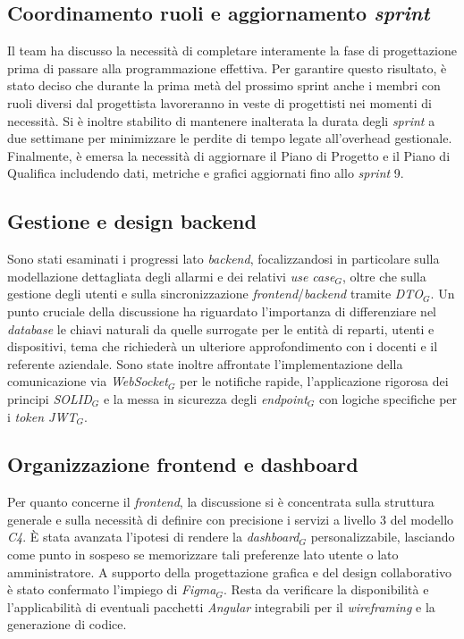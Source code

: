 \documentclass[10pt, letterpaper]{article}
\begin{document}
\subsection*{Coordinamento ruoli e aggiornamento \textit{sprint}}
Il team ha discusso la necessità di completare interamente la fase di progettazione prima di passare alla programmazione effettiva.
Per garantire questo risultato, è stato deciso che durante la prima metà del prossimo sprint anche i membri con ruoli diversi dal progettista lavoreranno in veste di progettisti nei momenti di necessità.
Si è inoltre stabilito di mantenere inalterata la durata degli \textit{sprint} a due settimane per minimizzare le perdite di tempo legate all'overhead gestionale.
Finalmente, è emersa la necessità di aggiornare il Piano di Progetto e il Piano di Qualifica includendo dati, metriche e grafici aggiornati fino allo \textit{sprint} 9.

\subsection*{Gestione e design backend}
Sono stati esaminati i progressi lato \textit{backend}, focalizzandosi in particolare sulla modellazione dettagliata
degli allarmi e dei relativi \textit{use case$_G$}, oltre che sulla gestione degli utenti e sulla sincronizzazione \textit{frontend}/\textit{backend} tramite \textit{DTO$_G$}.
Un punto cruciale della discussione ha riguardato l'importanza di differenziare nel \textit{database} le chiavi naturali da quelle surrogate per le entità di reparti,
utenti e dispositivi, tema che richiederà un ulteriore approfondimento con i docenti e il referente aziendale.
Sono state inoltre affrontate l'implementazione della comunicazione via \textit{WebSocket$_G$} per le notifiche rapide, l'applicazione rigorosa dei principi \textit{SOLID$_G$} e la messa in sicurezza degli \textit{endpoint$_G$} con logiche specifiche per i \textit{token JWT$_G$}.

\subsection*{Organizzazione frontend e dashboard}
Per quanto concerne il \textit{frontend}, la discussione si è concentrata sulla struttura generale e sulla necessità
di definire con precisione i servizi a livello 3 del modello \textit{C4}.
È stata avanzata l'ipotesi di rendere la \textit{dashboard$_G$} personalizzabile, lasciando come punto in sospeso se memorizzare tali preferenze lato utente o lato amministratore.
A supporto della progettazione grafica e del design collaborativo è stato confermato l'impiego di \textit{Figma$_G$}.
Resta da verificare la disponibilità e l'applicabilità di eventuali pacchetti \textit{Angular} integrabili per il \textit{wireframing} e la generazione di codice.
\end{document}
